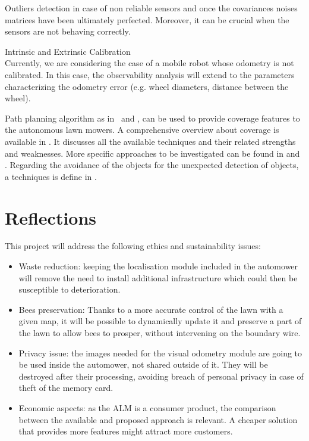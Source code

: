 Outliers detection in case of non reliable sensors and once the covariances noises matrices have been ultimately perfected. Moreover, it can be crucial when the sensors are not behaving correctly.


Intrinsic and Extrinsic Calibration\\
Currently, we are considering the case of a mobile
robot whose odometry is not calibrated. In this case,
the observability analysis will extend to the parameters
characterizing the odometry error (e.g. wheel diameters,
distance between the wheel).


Path planning algorithm as in~\cite{coveragePathplanning} and \cite{machines6040046}, can be used to provide coverage features to the autonomous lawn mowers.
A comprehensive overview about coverage is available in \cite{galceran_survey_2013}. It discusses all the available techniques and their related strengths and weaknesses.
More specific approaches to be investigated can be found in \cite{hameed_coverage_2017} and \cite{cabreira_grid-based_2019}.
Regarding the avoidance of the objects for the unexpected detection of objects, a techniques is define in \cite{daltorio_obstacle-edging_2010}.



\section{Reflections}
\label{sec:reflections}

\noindent This project will address the following ethics and sustainability issues:
\begin{itemize}
    \item Waste reduction: keeping the localisation module included in the automower will remove the need to install additional infrastructure which could then be susceptible to deterioration.
    \item Bees preservation: Thanks to a more accurate control of the lawn with a given map, it will be possible to dynamically update it and preserve a part of the lawn to allow bees to prosper, without intervening on the boundary wire.
    \item Privacy issue: the images needed for the visual odometry module are going to be used inside the automower, not shared outside of it. They will be destroyed after their processing, avoiding breach of personal privacy in case of theft of the memory card.
    \item Economic aspects: as the \gls{ALM} is a consumer product, the comparison between the available and proposed approach is relevant. A cheaper solution that provides more features might attract more customers.
\end{itemize}

